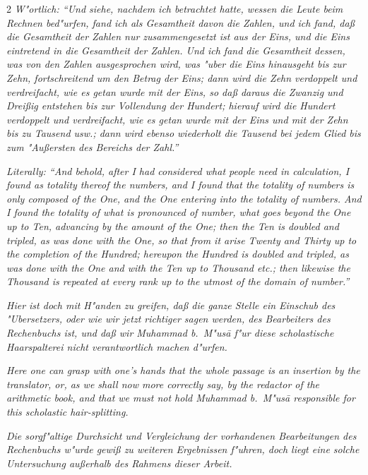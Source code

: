 \documentclass[10pt,a4paper]{article}
\newcommand{\enquote}[1]{``#1''}
\begin{document}
\begin{paracol}{2}
\textit{W"ortlich: \enquote{Und siehe, nachdem ich betrachtet hatte, wessen die Leute beim Rechnen bed"urfen, fand ich als Gesamtheit davon die Zahlen, und ich fand, da\ss{} die Gesamtheit der Zahlen nur zusammengesetzt ist aus der Eins, und die Eins eintretend in die Gesamtheit der Zahlen. Und ich fand die Gesamtheit dessen, was von den Zahlen ausgesprochen wird, was "uber die Eins hinausgeht bis zur Zehn, fortschreitend um den Betrag der Eins; dann wird die Zehn verdoppelt und verdreifacht, wie es getan wurde mit der Eins, so da\ss{} daraus die Zwanzig und Drei\ss{}ig entstehen bis zur Vollendung der Hundert; hierauf wird die Hundert verdoppelt und verdreifacht, wie es getan wurde mit der Eins und mit der Zehn bis zu Tausend usw.; dann wird ebenso wiederholt die Tausend bei jedem Glied bis zum "Au\ss{}ersten des Bereichs der Zahl.}}

\switchcolumn

\textit{Literally: \enquote{And behold, after I had considered what people need in calculation, I found as totality thereof the numbers, and I found that the totality of numbers is only composed of the One, and the One entering into the totality of numbers. And I found the totality of what is pronounced of number, what goes beyond the One up to Ten, advancing by the amount of the One; then the Ten is doubled and tripled, as was done with the One, so that from it arise Twenty and Thirty up to the completion of the Hundred; hereupon the Hundred is doubled and tripled, as was done with the One and with the Ten up to Thousand etc.; then likewise the Thousand is repeated at every rank up to the utmost of the domain of number.}}

\switchcolumn*

\textit{Hier ist doch mit H"anden zu greifen, da\ss{} die ganze Stelle ein Einschub des "Ubersetzers, oder wie wir jetzt richtiger sagen werden, des Bearbeiters des Rechenbuchs ist, und da\ss{} wir Muhammad b.\ M"us\=a f"ur diese scholastische Haarspalterei nicht verantwortlich machen d"urfen.}

\switchcolumn

\textit{Here one can grasp with one's hands that the whole passage is an insertion by the translator, or, as we shall now more correctly say, by the redactor of the arithmetic book, and that we must not hold Muhammad b.\ M"us\=a responsible for this scholastic hair-splitting.}

\switchcolumn*

\textit{Die sorgf"altige Durchsicht und Vergleichung der vorhandenen Bearbeitungen des Rechenbuchs w"urde gewi\ss{} zu weiteren Ergebnissen f"uhren, doch liegt eine solche Untersuchung au\ss{}erhalb des Rahmens dieser Arbeit.}


\end{paracol}
\end{document}
